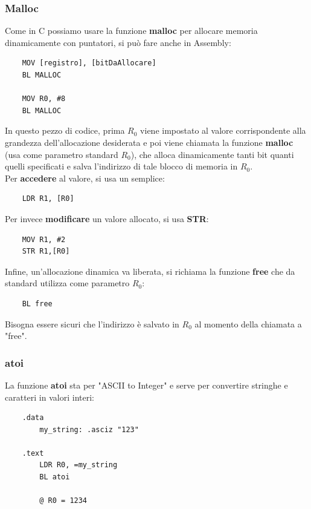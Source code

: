 \documentclass[12pt,a4paper]{article}
\begin{document}
\subsubsection{Malloc}
Come in C possiamo usare la funzione \textbf{malloc} per allocare memoria dinamicamente con puntatori, si può fare anche in Assembly:
\begin{lstlisting}
    MOV [registro], [bitDaAllocare]
    BL MALLOC

    MOV R0, #8
    BL MALLOC
\end{lstlisting}
In questo pezzo di codice, prima $R_0$ viene impostato al valore corrispondente alla grandezza dell'allocazione desiderata e poi viene chiamata la funzione \textbf{malloc} (usa come parametro standard $R_0$), che alloca dinamicamente tanti bit quanti quelli specificati e salva l'indirizzo di tale blocco di memoria in $R_0$.\\
Per \textbf{accedere} al valore, si usa un semplice:
\begin{lstlisting}
    LDR R1, [R0]
\end{lstlisting}
Per invece \textbf{modificare} un valore allocato, si usa \textbf{STR}:
\begin{lstlisting}
    MOV R1, #2
    STR R1,[R0]
\end{lstlisting}
Infine, un'allocazione dinamica va liberata, si richiama la funzione \textbf{free} che da standard utilizza come parametro $R_0$:
\begin{lstlisting}
    BL free
\end{lstlisting}
Bisogna essere sicuri che l'indirizzo è salvato in $R_0$ al momento della chiamata a "free".
\subsubsection{atoi}
La funzione \textbf{atoi} sta per "ASCII to Integer" e serve per convertire stringhe e caratteri in valori interi:
\begin{lstlisting}
    .data
        my_string: .asciz "123"

    .text
        LDR R0, =my_string
        BL atoi

        @ R0 = 1234
\end{lstlisting}
\end{document}
